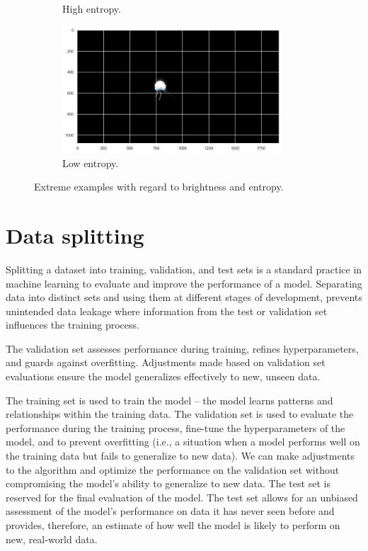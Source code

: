 \documentclass[Master,MDS,english]{BASE/twbook} %
\begin{document}
\begin{figure}
\begin{subfigure}{.5\textwidth}
  \caption{High entropy.}
  \label{railsem_sub3}
\end{subfigure}%
\begin{subfigure}{.5\textwidth}
  \centering
  \includegraphics[width=0.9\textwidth]{images/datasets/railsem/example_low_entropy}
  \caption{Low entropy.}
  \label{railsem_sub4}
\end{subfigure}
\caption{Extreme examples with regard to brightness and entropy.}
\label{fig:examples}
\end{figure}


\section{Data splitting}

Splitting a dataset into training, validation, and test sets is a standard practice in machine learning to evaluate and improve the performance of a model. 
 Separating data into distinct sets and using them at different stages of development, prevents unintended data leakage where information from the test or validation set influences the training process.
 
 The validation set assesses performance during training, refines hyperparameters, and guards against overfitting. Adjustments made based on validation set evaluations ensure the model generalizes effectively to new, unseen data. 

The training set is used to train the model -- the model learns patterns and relationships within the training data.
The validation set is used to evaluate the performance during the training process, fine-tune the hyperparameters of the model, and to prevent overfitting (i.e., a situation when a model performs well on the training data but fails to generalize to new data). We can make adjustments to the algorithm and optimize the performance on the validation set without compromising the model's ability to generalize to new data. 
The test set is reserved for the final evaluation of the model. The test set allows for an unbiased assessment of the model's performance on data it has never seen before and provides, therefore, an estimate of how well the model is likely to perform on new, real-world data.
\end{document}
